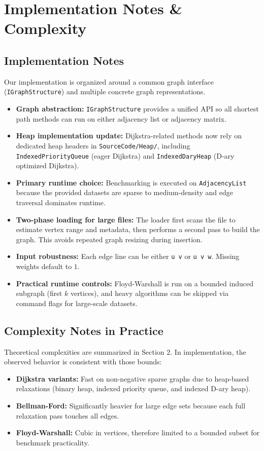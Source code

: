 \section{Implementation Notes \& Complexity}

\subsection{Implementation Notes}
Our implementation is organized around a common graph interface (\texttt{IGraphStructure}) and multiple concrete graph representations.

\begin{itemize}
	\item \textbf{Graph abstraction:} \texttt{IGraphStructure} provides a unified API so all shortest path methods can run on either adjacency list or adjacency matrix.
	\item \textbf{Heap implementation update:}
	Dijkstra-related methods now rely on dedicated heap headers in \texttt{SourceCode/Heap/}, including \texttt{IndexedPriorityQueue} (eager Dijkstra) and \texttt{IndexedDaryHeap} (D-ary optimized Dijkstra).
	\item \textbf{Primary runtime choice:} Benchmarking is executed on \texttt{AdjacencyList} because the provided datasets are sparse to medium-density and edge traversal dominates runtime.
	\item \textbf{Two-phase loading for large files:}
	The loader first scans the file to estimate vertex range and metadata, then performs a second pass to build the graph. This avoids repeated graph resizing during insertion.
	\item \textbf{Input robustness:}
	Each edge line can be either \texttt{u v} or \texttt{u v w}. Missing weights default to $1$.
	\item \textbf{Practical runtime controls:}
	Floyd-Warshall is run on a bounded induced subgraph (first $k$ vertices), and heavy algorithms can be skipped via command flags for large-scale datasets.
\end{itemize}

\subsection{Complexity Notes in Practice}
Theoretical complexities are summarized in Section 2. In implementation, the observed behavior is consistent with those bounds:

\begin{itemize}
	\item \textbf{Dijkstra variants:} Fast on non-negative sparse graphs due to heap-based relaxations (binary heap, indexed priority queue, and indexed D-ary heap).
	\item \textbf{Bellman-Ford:} Significantly heavier for large edge sets because each full relaxation pass touches all edges.
	\item \textbf{Floyd-Warshall:} Cubic in vertices, therefore limited to a bounded subset for benchmark practicality.
\end{itemize}

